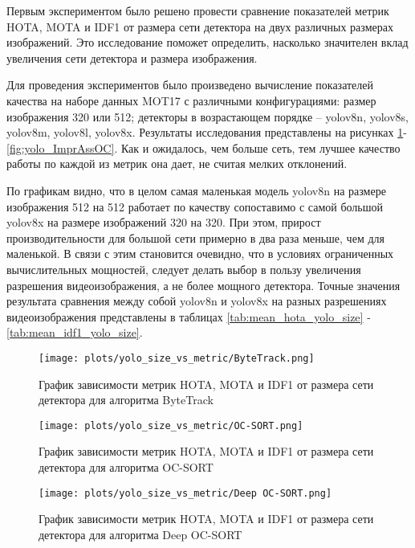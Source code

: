Первым экспериментом было решено провести сравнение показателей метрик HOTA, MOTA и IDF1 от размера сети детектора на двух различных размерах изображений. Это исследование поможет определить, насколько значителен вклад увеличения сети детектора и размера изображения. 

Для проведения экспериментов было произведено вычисление показателей качества на наборе данных MOT17 с различными конфигурациями: размер изображения 320 или 512; детекторы в возрастающем порядке -- yolov8n, yolov8s, yolov8m, yolov8l, yolov8x. Результаты исследования представлены на рисунках \ref{fig:yolo_ByteTrack}-\ref{fig:yolo_ImprAssOC}. Как и ожидалось, чем больше сеть, тем лучшее качество работы по каждой из метрик она дает, не считая мелких отклонений.

По графикам видно, что в целом самая маленькая модель yolov8n на размере изображения 512 на 512 работает по качеству сопоставимо с самой большой yolov8x на размере изображений 320 на 320. При этом, прирост производительности для большой сети примерно в два раза меньше, чем для маленькой.
В связи с этим становится очевидно, что в условиях ограниченных вычислительных мощностей, следует делать выбор в пользу увеличения разрешения видеоизображения, а не более мощного детектора.
Точные значения результата сравнения между собой yolov8n и yolov8x на разных разрешениях видеоизображения представлены в таблицах \ref{tab:mean_hota_yolo_size} - \ref{tab:mean_idf1_yolo_size}.

\begin{figure}[ht]
    \centering
    \texttt{[image: plots/yolo\_size\_vs\_metric/ByteTrack.png]}
    \caption{График зависимости метрик HOTA, MOTA и IDF1 от размера сети детектора для алгоритма ByteTrack}
    \label{fig:yolo_ByteTrack}
\end{figure}

\begin{figure}[ht]
    \centering
    \texttt{[image: plots/yolo\_size\_vs\_metric/OC-SORT.png]}
    \caption{График зависимости метрик HOTA, MOTA и IDF1 от размера сети детектора для алгоритма OC-SORT}
    \label{fig:yolo_OC-SORT}
\end{figure}

\begin{figure}[ht]
    \centering
    \texttt{[image: plots/yolo\_size\_vs\_metric/Deep OC-SORT.png]}
    \caption{График зависимости метрик HOTA, MOTA и IDF1 от размера сети детектора для алгоритма Deep OC-SORT}
    \label{fig:yolo_Deep OC-SORT}
\end{figure}

